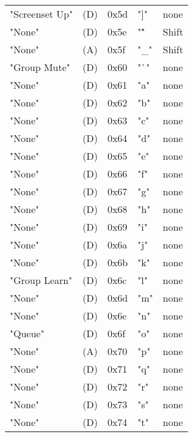 \begin{table}[htb]
\begin{tabular}{l l l l l}
        "Screenset Up"       & (D)  &  0x5d   & "]"          & none \\
        "None"               & (D)  &  0x5e   & "\^"         & Shift \\
        "None"               & (A)  &  0x5f   & "\_"         & Shift \\
        "Group Mute"         & (D)  &  0x60   & "`"          & none \\
        "None"               & (D)  &  0x61   & "a"          & none \\
        "None"               & (D)  &  0x62   & "b"          & none \\
        "None"               & (D)  &  0x63   & "c"          & none \\
        "None"               & (D)  &  0x64   & "d"          & none \\
        "None"               & (D)  &  0x65   & "e"          & none \\
        "None"               & (D)  &  0x66   & "f"          & none \\
        "None"               & (D)  &  0x67   & "g"          & none \\
        "None"               & (D)  &  0x68   & "h"          & none \\
        "None"               & (D)  &  0x69   & "i"          & none \\
        "None"               & (D)  &  0x6a   & "j"          & none \\
        "None"               & (D)  &  0x6b   & "k"          & none \\
        "Group Learn"        & (D)  &  0x6c   & "l"          & none \\
        "None"               & (D)  &  0x6d   & "m"          & none \\
        "None"               & (D)  &  0x6e   & "n"          & none \\
        "Queue"              & (D)  &  0x6f   & "o"          & none \\
        "None"               & (A)  &  0x70   & "p"          & none \\
        "None"               & (D)  &  0x71   & "q"          & none \\
        "None"               & (D)  &  0x72   & "r"          & none \\
        "None"               & (D)  &  0x73   & "s"          & none \\
        "None"               & (D)  &  0x74   & "t"          & none \\

\end{tabular}
\end{table}
